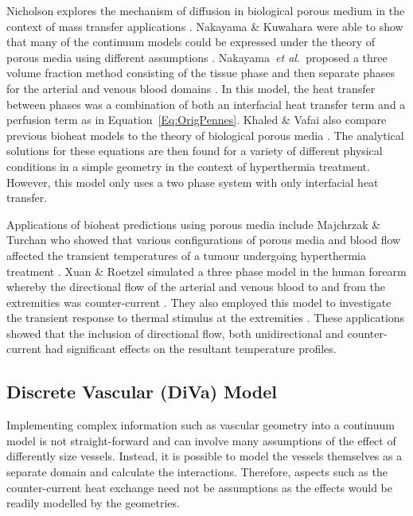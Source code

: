 \documentclass[11pt,english,a4paper,twoside,openright]{report}
\begin{document}
{{{{{{{{	Nicholson explores the mechanism of diffusion in biological porous medium in the context of mass transfer applications \cite{nicholson2001diffusion}. Nakayama \& Kuwahara were able to show that many of the continuum models could be expressed under the theory of porous media using different assumptions \cite{nakayama2008general}\cite{nakayama2011general}. Nakayama~\textit{et al.\ }proposed a three volume fraction method consisting of the tissue phase and then separate phases for the arterial and venous blood domains \cite{nakayama2010rigorous}. In this model, the heat transfer between phases was a combination of both an interfacial heat transfer term and a perfusion term as in Equation~\ref{Eq:OrigPennes}. Khaled \& Vafai also compare previous bioheat models to the theory of biological porous media \cite{khaled2003role}. The analytical solutions for these equations are then found for a variety of different physical conditions in a simple geometry \cite{mahjoob2009analytical} in the context of hyperthermia treatment. However, this model only uses a two phase system with only interfacial heat transfer.
	
	Applications of bioheat predictions using porous media include Majchrzak \& Turchan who showed that various configurations of porous media and blood flow affected the transient temperatures of a tumour undergoing hyperthermia treatment \cite{majchrzak2013numerical}. Xuan \& Roetzel simulated a three phase model in the human forearm whereby the directional flow of the arterial and venous blood to and from the extremities was counter-current \cite{xuan1997bioheat}. They also employed this model to investigate the transient response to thermal stimulus at the extremities \cite{roetzel1998transient}. These applications showed that the inclusion of directional flow, both unidirectional and counter-current had significant effects on the resultant temperature profiles.
	
	\subsection{Discrete Vascular (DiVa) Model}
	
	Implementing complex information such as vascular geometry into a continuum model is not straight-forward and can involve many assumptions of the effect of differently size vessels. Instead, it is possible to model the vessels themselves as a separate domain and calculate the interactions. Therefore, aspects such as the counter-current heat exchange need not be assumptions as the effects would be readily modelled by the geometries.
	
}}}}}}}}
\end{document}
